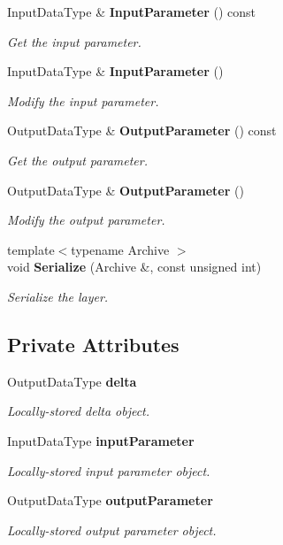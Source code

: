 \begin{DoxyCompactItemize}
Input\+Data\+Type \& {\bf Input\+Parameter} () const 
\begin{DoxyCompactList}\small\item\em Get the input parameter. \end{DoxyCompactList}\item 
Input\+Data\+Type \& {\bf Input\+Parameter} ()
\begin{DoxyCompactList}\small\item\em Modify the input parameter. \end{DoxyCompactList}\item 
Output\+Data\+Type \& {\bf Output\+Parameter} () const 
\begin{DoxyCompactList}\small\item\em Get the output parameter. \end{DoxyCompactList}\item 
Output\+Data\+Type \& {\bf Output\+Parameter} ()
\begin{DoxyCompactList}\small\item\em Modify the output parameter. \end{DoxyCompactList}\item 
{\footnotesize template$<$typename Archive $>$ }\\void {\bf Serialize} (Archive \&, const unsigned int)
\begin{DoxyCompactList}\small\item\em Serialize the layer. \end{DoxyCompactList}\end{DoxyCompactItemize}
\subsection*{Private Attributes}
\begin{DoxyCompactItemize}
\item 
Output\+Data\+Type {\bf delta}
\begin{DoxyCompactList}\small\item\em Locally-\/stored delta object. \end{DoxyCompactList}\item 
Input\+Data\+Type {\bf input\+Parameter}
\begin{DoxyCompactList}\small\item\em Locally-\/stored input parameter object. \end{DoxyCompactList}\item 
Output\+Data\+Type {\bf output\+Parameter}
\begin{DoxyCompactList}\small\item\em Locally-\/stored output parameter object. \end{DoxyCompactList}\end{DoxyCompactItemize}



